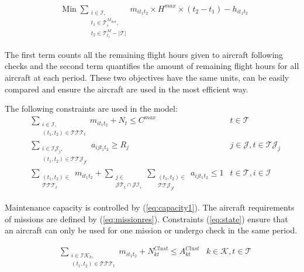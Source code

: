 \documentclass[a4paper,onecolumn,fleqn]{article}
\begin{document}
    \begin{align}
        & \text{Min}\; \sum_{\substack{i \in \mathcal{I}, \\ t_1 \in \mathcal{T}^{M_{Init}}_i, \\ t_2 \in \mathcal{T}^M_{t_1} - |\mathcal{T}|}} m_{it_1t_2} \times H^{max} \times (t_2 - t_1) - h_{it_1t_2}  \label{eq:objective1}
    \end{align}
    
    The first term counts all the remaining flight hours given to aircraft following checks and the second term quantifies the amount of remaining flight hours for all aircraft at each period. These two objectives have the same units, can be easily compared and ensure the aircraft are used in the most efficient way.

    The following constraints are used in the model:
    \begin{align}
        & \sum_{\substack{i \in \mathcal{I}, \\ (t_1, t_2) \in \mathcal{T}\mathcal{T}\mathcal{T}_{t}}} m_{it_1t_2} + N_t \leq C^{max}
          & t \in \mathcal{T} \label{eq:capacity1}\\
        & \sum_{\substack{i \in \mathcal{IJ}_j, \\ (t_1, t_2) \in \mathcal{T}\mathcal{T}\mathcal{J}_{jt}}} a_{ijt_1t_2} \geq R_j
                & j \in \mathcal{J}, t \in \mathcal{TJ}_j  \label{eq:missionres}\\
        & \sum_{\substack{(t_1, t_2) \in \\ \mathcal{T}\mathcal{T}\mathcal{T}_{t}}} m_{it_1t_2} + \sum_{\substack{j \in \\ \mathcal{JT}_t \cap \mathcal{JI}_i}} \sum_{\substack{(t_1, t_2) \in \\ \mathcal{T}\mathcal{T}\mathcal{J}_{jt}}} a_{ijt_1t_2} \leq 1 
                & t \in \mathcal{T}, i \in \mathcal{I} \label{eq:state}
    \end{align}

    Maintenance capacity is controlled by (\ref{eq:capacity1}). The aircraft requirements of missions are defined by (\ref{eq:missionres}). Constraints (\ref{eq:state}) ensure that an aircraft can only be used for one mission or undergo check in the same period.

    \begin{align}
       & \sum_{\substack{i \in \mathcal{IK}_k, \\ (t_1, t_2) \in \mathcal{T}\mathcal{T}\mathcal{T}_{t}}} m_{it_1t_2} + N^{Clust}_{kt} \leq A^{Clust}_{kt}
        &k \in \mathcal{K}, t \in \mathcal{T} \label{eq:serviceability-cluster}
    \end{align}
\end{document}
